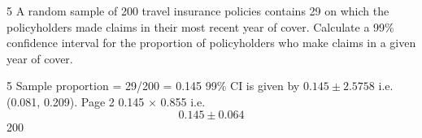 \documentclass[a4paper,12pt]{article}
\begin{document}
\newpage



5
A random sample of 200 travel insurance policies contains 29 on which the
policyholders made claims in their most recent year of cover.
Calculate a 99\% confidence interval for the proportion of policyholders who make
claims in a given year of cover.



5
Sample proportion = 29/200 = 0.145
99\% CI is given by $0.145 \pm 2.5758$
i.e. (0.081, 0.209).
Page 2
0.145 × 0.855
i.e. \[0.145 \pm 0.064\]
200
\end{document}

